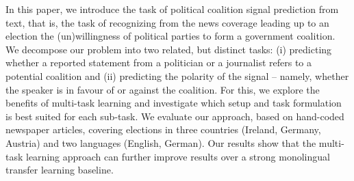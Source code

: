 In this paper, we introduce the task of political coalition signal prediction from text, that is, the task of recognizing from the news coverage leading up to an election the (un)willingness of political parties to form a government coalition. We decompose our problem into two related, but distinct tasks: (i) predicting whether a reported statement from a politician or a journalist refers to a potential coalition and (ii) predicting the polarity of the signal -- namely, whether the speaker is in favour of or against the coalition. For this, we explore the benefits of multi-task learning and investigate which setup and task formulation is best suited for each sub-task. We evaluate our approach, based on hand-coded newspaper articles, covering elections in three countries (Ireland, Germany, Austria) and two languages (English, German). Our results show that the multi-task learning approach can further improve results over a strong monolingual transfer learning baseline.
